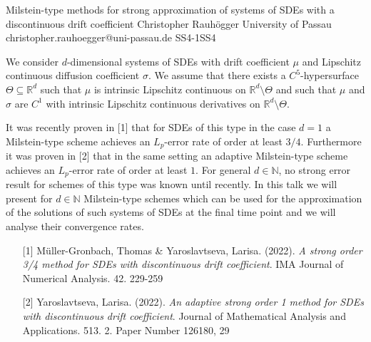 \begin{talk}
  {Milstein-type methods for strong approximation of systems of SDEs with a discontinuous drift coefficient}%
  {Christopher Rauhögger}%
  {University of Passau}%
  {christopher.rauhoegger@uni-passau.de}%
  {}%
{}{}{SS4-1}{SS4}

			
We consider $d$-dimensional systems of SDEs with drift coefficient $\mu$ and Lipschitz continuous diffusion coefficient $\sigma$. We assume that there exists a $C^{5}$-hypersurface
$\Theta\subseteq \mathbb{R}^{d}$ such that $\mu$ is intrinsic Lipschitz continuous on $\mathbb{R}^{d}\setminus \Theta$ and such that $\mu$ and $\sigma$ are $C^{1}$ with intrinsic Lipschitz continuous derivatives on $\mathbb{R}^{d}\setminus \Theta$. 

It was recently proven in [1] that for SDEs of this type in the case $d = 1$ a Milstein-type scheme achieves an $L_{p}$-error rate of order at least $3/4$. Furthermore it was proven in [2] that in the same setting an adaptive
Milstein-type scheme achieves an $L_{p}$-error rate of order at least $1$. 
For general $d \in \mathbb{N}$, no strong error result for schemes of this type was known until recently.
In this talk we will present for $d \in \mathbb{N}$ Milstein-type schemes which can be used for the approximation 
of the solutions of such systems of SDEs at the final time point and we will analyse their convergence rates. 

\medskip

\begin{enumerate}
	\item[{[1]}] M\"{u}ller-Gronbach, Thomas \& Yaroslavtseva, Larisa. (2022). {\it A strong order 3/4 method for {SDE}s with discontinuous drift
		coefficient}. IMA Journal of Numerical Analysis. 42. 229-259
	\item[{[2]}] Yaroslavtseva, Larisa. (2022). {\it An adaptive strong order 1 method for {SDE}s with
		discontinuous drift coefficient}. Journal of Mathematical Analysis and Applications. 513. 2. Paper Number 126180, 29
\end{enumerate}

\end{talk}

